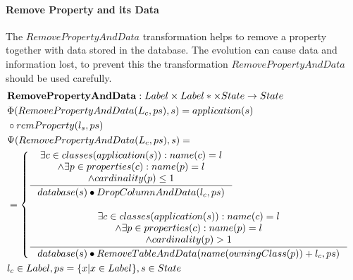 \documentclass[11pt]{article}
\begin{document}
\paragraph{Remove Property and its Data} The $RemovePropertyAndData$ transformation helps to remove a property together with data stored in the database. The evolution can cause data and information lost, to prevent this the transformation $RemovePropertyAndData$ should be used carefully.
\begin{align*}
&	\mathbf{RemovePropertyAndData} : Label \times Label* \times State \rightarrow State \\
&	\Phi(RemovePropertyAndData(L_c, ps), s) = application(s)\\ 
&  \circ remProperty(l_s, ps) \\
&	\Psi(RemovePropertyAndData(L_c, ps), s) = \\
& = \begin{cases}
 		\inference{\exists c \in classes(application(s)) : name(c) = l\\ 	\wedge \exists p \in properties(c) : name(p) = l \\ \wedge cardinality(p) \leq 1}{database(s) \bullet DropColumnAndData(l_c, ps)}\\\\
 	\inference{\exists c \in classes(application(s)) : name(c) = l\\ 	\wedge \exists p \in properties(c) : name(p) = l \\ \wedge cardinality(p) > 1}{database(s) \bullet RemoveTableAndData(name(owningClass(p))+l_c, ps)}
 \end{cases}
	\\
&	l_c \in Label, ps = \{x | x \in Label\}, s \in State
\end{align*}
\end{document}
